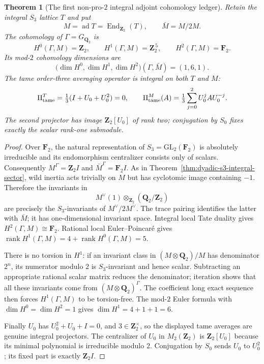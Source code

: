 \documentclass[11pt]{article}
\newtheorem{theorem}{Theorem}[section]
\theoremstyle{definition}
\begin{document}
\begin{theorem}[The first non-pro-$2$ integral adjoint cohomology ledger]
\label{thm:dyadic-s3-adjoint-local-cohomology}
Retain the integral $S_3$ lattice $T$
and put
\[
M=\operatorname{ad}T
=\operatorname{End}_{\mathbf Z_2}(T),
\qquad \bar M=M/2M.
\]
The cohomology of $\Gamma=G_{\mathbf Q_2}$
is
\begin{equation}\label{eq:dyadic-s3-adjoint-integral-ledger}
\boxed{\quad
H^0(\Gamma,M)=\mathbf Z_2,\qquad
H^1(\Gamma,M)=\mathbf Z_2^{\,5},\qquad
H^2(\Gamma,M)=\mathbf F_2.
\quad}
\end{equation}
Its mod-$2$ cohomology dimensions are
\begin{equation}\label{eq:dyadic-s3-adjoint-mod2-ledger}
\boxed{\quad
\bigl(\dim H^0,\dim H^1,\dim H^2\bigr)
(\Gamma,\bar M)=(1,6,1).
\quad}
\end{equation}
The tame order-three averaging operator
is integral on both $T$ and $M$:
\begin{equation}\label{eq:dyadic-s3-tame-averaging}
\Pi_{\rm tame}^T
=\tfrac13(I+U_0+U_0^2)=0,\qquad
\Pi_{\rm tame}^M(A)
=\tfrac13\sum_{j=0}^2U_0^jAU_0^{-j}.
\end{equation}
The second projector has image
$\mathbf Z_2[U_0]$ of rank two;
conjugation by $S_0$ fixes exactly
the scalar rank-one submodule.
\end{theorem}

\begin{proof}
Over $\mathbf F_2$, the natural
representation of $S_3=\mathrm{GL}_2(\mathbf F_2)$
is absolutely irreducible and its
endomorphism centralizer consists
only of scalars.  Consequently
$M^\Gamma=\mathbf Z_2 I$ and
$\bar M^\Gamma=\mathbf F_2 I$.
As in Theorem~\ref{thm:dyadic-s3-integral-sector},
wild inertia acts trivially on $M$
but has cyclotomic image containing
$-1$.  Therefore the invariants in
\[
M^\vee(1)\otimes_{\mathbf Z_2}
(\mathbf Q_2/\mathbf Z_2)
\]
are precisely the $S_3$-invariants
of $M^\vee/2M^\vee$.
The trace pairing identifies the
latter with $\bar M$;
it has one-dimensional invariant
space.  Integral local Tate duality
gives $H^2(\Gamma,M)\cong\mathbf F_2$.
Rational local Euler--Poincar\'e
gives
$\operatorname{rank}H^1(\Gamma,M)
=4+\operatorname{rank}H^0(\Gamma,M)=5$.

There is no torsion in $H^1$:
if an invariant class in
$(M\otimes\mathbf Q_2)/M$
has denominator $2^n$, its
numerator modulo $2$ is
$S_3$-invariant and hence scalar.
Subtracting an appropriate
rational scalar matrix reduces
the denominator; iteration shows
that all these invariants come
from $(M\otimes\mathbf Q_2)^\Gamma$.
The coefficient long exact
sequence then forces
$H^1(\Gamma,M)$ to be torsion-free.
The mod-$2$ Euler formula with
$\dim H^0=\dim H^2=1$ gives
$\dim H^1=4+1+1=6$.

Finally $U_0$ has
$U_0^2+U_0+I=0$, and
$3\in\mathbf Z_2^\times$,
so the displayed tame averages
are genuine integral projectors.
The centralizer of $U_0$ in
$M_2(\mathbf Z_2)$ is
$\mathbf Z_2[U_0]$ because its
minimal polynomial is irreducible
modulo $2$.  Conjugation by
$S_0$ sends $U_0$ to $U_0^2$;
its fixed part is exactly
$\mathbf Z_2 I$.
\end{proof}
\end{document}
